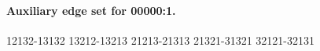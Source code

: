 \paragraph{Auxiliary edge set for 00000:1.}
\begingroup\footnotesize\ttfamily\begin{flushleft}
12132-13132 13212-13213 21213-21313 21321-31321 32121-32131\\
\end{flushleft}\endgroup
\begingroup
\setlength{\columnsep}{14pt}
\renewcommand{\paragraph}[1]{\par\addvspace{1ex}\noindent
  {\normalfont\small\bfseries #1}\par\nobreak}
\renewenvironment{flushleft}{\par\raggedright}{\par}
